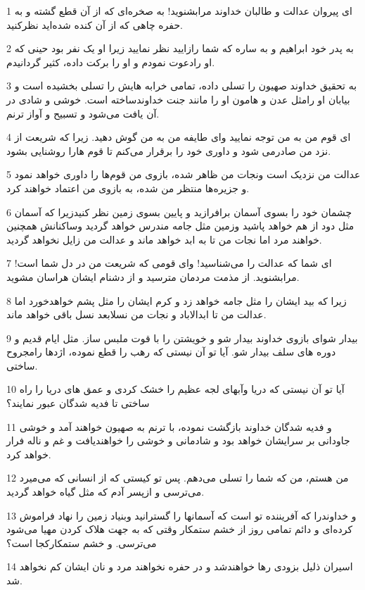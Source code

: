 \par 1 ای پیروان عدالت و طالبان خداوند مرابشنوید! به صخره‌ای که از آن قطع گشته و به حفره چاهی که از آن کنده شده‌اید نظرکنید.
\par 2 به پدر خود ابراهیم و به ساره که شما رازایید نظر نمایید زیرا او یک نفر بود حینی که او رادعوت نمودم و او را برکت داده، کثیر گردانیدم.
\par 3 به تحقیق خداوند صهیون را تسلی داده، تمامی خرابه هایش را تسلی بخشیده است و بیابان او رامثل عدن و هامون او را مانند جنت خداوندساخته است. خوشی و شادی در آن یافت می‌شود و تسبیح و آواز ترنم.
\par 4 ‌ای قوم من به من توجه نمایید و‌ای طایفه من به من گوش دهید. زیرا که شریعت از نزد من صادرمی شود و داوری خود را برقرار می‌کنم تا قوم هارا روشنایی بشود.
\par 5 عدالت من نزدیک است ونجات من ظاهر شده، بازوی من قوم‌ها را داوری خواهد نمود و جزیره‌ها منتظر من شده، به بازوی من اعتماد خواهند کرد.
\par 6 چشمان خود را بسوی آسمان برافرازید و پایین بسوی زمین نظر کنیدزیرا که آسمان مثل دود از هم خواهد پاشید وزمین مثل جامه مندرس خواهد گردید وساکنانش همچنین خواهند مرد اما نجات من تا به ابد خواهد ماند و عدالت من زایل نخواهد گردید.
\par 7 ‌ای شما که عدالت را می‌شناسید! و‌ای قومی که شریعت من در دل شما است! مرابشنوید. از مذمت مردمان مترسید و از دشنام ایشان هراسان مشوید.
\par 8 زیرا که بید ایشان را مثل جامه خواهد زد و کرم ایشان را مثل پشم خواهدخورد اما عدالت من تا ابدالاباد و نجات من نسلابعد نسل باقی خواهد ماند.
\par 9 بیدار شو‌ای بازوی خداوند بیدار شو و خویشتن را با قوت ملبس ساز. مثل ایام قدیم و دوره های سلف بیدار شو. آیا تو آن نیستی که رهب را قطع نموده، اژدها رامجروح ساختی.
\par 10 آیا تو آن نیستی که دریا وآبهای لجه عظیم را خشک کردی و عمق های دریا را راه ساختی تا فدیه شدگان عبور نمایند؟
\par 11 و فدیه شدگان خداوند بازگشت نموده، با ترنم به صهیون خواهند آمد و خوشی جاودانی بر سرایشان خواهد بود و شادمانی و خوشی را خواهندیافت و غم و ناله فرار خواهد کرد.
\par 12 من هستم، من که شما را تسلی می‌دهم. پس تو کیستی که از انسانی که می‌میرد می‌ترسی و ازپسر آدم که مثل گیاه خواهد گردید.
\par 13 و خداوندرا که آفریننده تو است که آسمانها را گسترانید وبنیاد زمین را نهاد فراموش کرده‌ای و دائم تمامی روز از خشم ستمکار وقتی که به جهت هلاک کردن مهیا می‌شود می‌ترسی. و خشم ستمکارکجا است؟
\par 14 اسیران ذلیل بزودی رها خواهندشد و در حفره نخواهند مرد و نان ایشان کم نخواهد شد.
